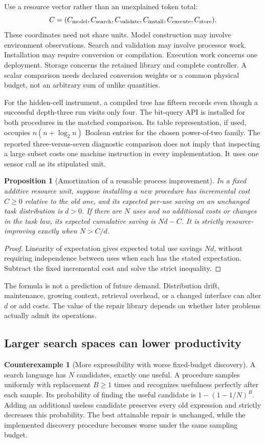 \documentclass[11pt,letterpaper]{article}
\theoremstyle{plain}
\newtheorem{proposition}[theorem]{Proposition}
\theoremstyle{definition}
\newtheorem{counterexample}[theorem]{Counterexample}
\begin{document}
Use a resource vector rather than an unexplained token total:
\[
C=(C_{\rm model},C_{\rm search},C_{\rm validate},C_{\rm install},
C_{\rm execute},C_{\rm store}).
\]
These coordinates need not share units. Model construction may involve environment observations. Search and validation may involve processor work. Installation may require conversion or compilation. Execution work concerns one deployment. Storage concerns the retained library and complete controller. A scalar comparison needs declared conversion weights or a common physical budget, not an arbitrary sum of unlike quantities.

For the hidden-cell instrument, a compiled tree has fifteen records even though a successful depth-three run visits only four. The bit-query API is installed for both procedures in the matched comparison. Its table representation, if used, occupies $n(n+\log_2n)$ Boolean entries for the chosen power-of-two family. The reported three-versus-seven diagnostic comparison does not imply that inspecting a large subset costs one machine instruction in every implementation. It uses one sensor call as its stipulated unit.

\begin{proposition}[Amortization of a reusable process improvement]\label{prop:amortization}
In a fixed additive resource unit, suppose installing a new procedure has incremental cost $C\geq0$ relative to the old one, and its expected per-use saving on an unchanged task distribution is $d>0$. If there are $N$ uses and no additional costs or changes in the task law, its expected cumulative saving is $Nd-C$. It is strictly resource-improving exactly when $N>C/d$.
\end{proposition}
\begin{proof}
Linearity of expectation gives expected total use savings $Nd$, without requiring independence between uses when each has the stated expectation. Subtract the fixed incremental cost and solve the strict inequality.
\end{proof}

The formula is not a prediction of future demand. Distribution drift, maintenance, growing context, retrieval overhead, or a changed interface can alter $d$ or add costs. The value of the repair library depends on whether later problems actually admit its operations.

\subsection{Larger search spaces can lower productivity}
\begin{counterexample}[More expressibility with worse fixed-budget discovery]\label{ex:dilution}
A search language has $N$ candidates, exactly one useful. A procedure samples uniformly with replacement $B\geq1$ times and recognizes usefulness perfectly after each sample. Its probability of finding the useful candidate is $1-(1-1/N)^B$. Adding an additional useless candidate preserves every old expression and strictly decreases this probability. The best attainable repair is unchanged, while the implemented discovery procedure becomes worse under the same sampling budget.
\end{counterexample}
\end{document}
